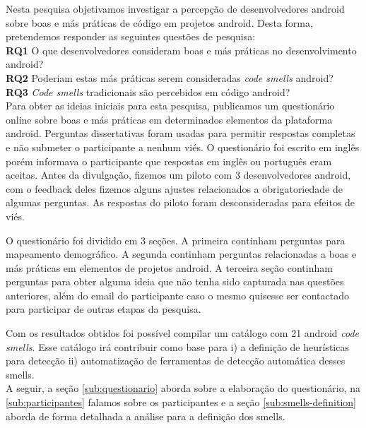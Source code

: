 Nesta pesquisa objetivamos investigar a percep\c{c}\~ao de desenvolvedores android sobre boas e m\'as pr\'aticas de c\'odigo em projetos android. Desta forma, pretendemos responder as seguintes quest\~oes de pesquisa: \\

\textbf{RQ1} O que desenvolvedores consideram boas e m\'as pr\'aticas no desenvolvimento android? \\

\textbf{RQ2} Poderiam estas m\'as pr\'aticas serem consideradas \textit{code smells} android? \\

\textbf{RQ3} \textit{Code smells} tradicionais s\~ao percebidos em c\'odigo android? \\

Para obter as ideias iniciais para esta pesquisa, publicamos um question\'ario online sobre boas e m\'as pr\'aticas em determinados elementos da plataforma android. Perguntas dissertativas foram usadas para permitir respostas completas e n\~ao submeter o participante a nenhum vi\'es. O question\'ario foi escrito em ingl\^es por\'em informava o participante que respostas em ingl\^es ou portugu\^es eram aceitas. Antes da divulga\c{c}\~ao, fizemos um piloto com 3 desenvolvedores android, com o feedback deles fizemos alguns ajustes relacionados a obrigatoriedade de algumas perguntas. As respostas do piloto foram desconsideradas para efeitos de vi\'es. 

O question\'ario foi dividido em 3 se\c{c}\~oes. A primeira continham perguntas para mapeamento demogr\'afico. A segunda continham perguntas relacionadas a boas e m\'as pr\'aticas em elementos de projetos android. A terceira se\c{c}\~ao continham perguntas para obter alguma ideia que n\~ao tenha sido capturada nas quest\~oes anteriores, al\'em do email do participante caso o mesmo quisesse ser contactado para participar de outras etapas da pesquisa. 

Com os resultados obtidos foi poss\'ivel compilar um cat\'alogo com 21 android \textit{code smells}. Esse cat\'alogo ir\'a contribuir como base para i) a defini\c{c}\~ao de heur\'isticas para detec\c{c}\~ao ii) automatiza\c{c}\~ao de ferramentas de detec\c{c}\~ao autom\'atica desses smells. \\

A seguir, a se\c{c}\~ao \ref{sub:questionario} aborda sobre a elabora\c{c}\~ao do question\'ario, na \ref{sub:participantes} falamos sobre os participantes e a se\c{c}\~ao \ref{sub:smells-definition} aborda de forma detalhada a an\'alise para a defini\c{c}\~ao dos smells.

